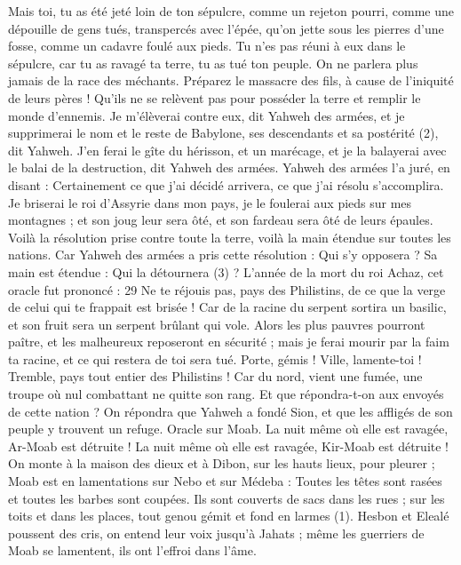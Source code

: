 \begin{multicols}{2}
Mais toi, tu as été jeté loin de ton sépulcre, comme un rejeton pourri, comme une dépouille de gens tués, transpercés avec l'épée, qu’on jette sous les pierres d’une fosse, comme un cadavre foulé aux pieds.
Tu n’es pas réuni à eux dans le sépulcre, car tu as ravagé ta terre, tu as tué ton peuple. On ne parlera plus jamais de la race des méchants.
Préparez le massacre des fils, à cause de l'iniquité de leurs pères ! Qu’ils ne se relèvent pas pour posséder la terre et remplir le monde d’ennemis.
Je m'élèverai contre eux, dit Yahweh des armées, et je supprimerai le nom et le reste de Babylone, ses descendants et sa postérité (2), dit Yahweh.
J’en ferai le gîte du hérisson, et un marécage, et je la balayerai avec le balai de la destruction, dit Yahweh des armées.
Yahweh des armées l’a juré, en disant : Certainement ce que j’ai décidé arrivera, ce que j’ai résolu s’accomplira.
Je briserai le roi d'Assyrie dans mon pays, je le foulerai aux pieds sur mes montagnes ; et son joug leur sera ôté, et son fardeau sera ôté de leurs épaules.
Voilà la résolution prise contre toute la terre, voilà la main étendue sur toutes les nations.
Car Yahweh des armées a pris cette résolution : Qui s’y opposera ? Sa main est étendue : Qui la détournera (3) ?
L'année de la mort du roi Achaz, cet oracle fut prononcé : 29 Ne te réjouis pas, pays des Philistins, de ce que la verge de celui qui te frappait est brisée ! Car de la racine du serpent sortira un basilic, et son fruit sera un serpent brûlant qui vole.
Alors les plus pauvres pourront paître, et les malheureux reposeront en sécurité ; mais je ferai mourir par la faim ta racine, et ce qui restera de toi sera tué.
Porte, gémis ! Ville, lamente-toi ! Tremble, pays tout entier des Philistins ! Car du nord, vient une fumée, une troupe où nul combattant ne quitte son rang.
Et que répondra-t-on aux envoyés de cette nation ? On répondra que Yahweh a fondé Sion, et que les affligés de son peuple y trouvent un refuge.
\VerseOne{}Oracle sur Moab. La nuit même où elle est ravagée, Ar-Moab est détruite ! La nuit même où elle est ravagée, Kir-Moab est détruite !
On monte à la maison des dieux et à Dibon, sur les hauts lieux, pour pleurer ; Moab est en lamentations sur Nebo et sur Médeba : Toutes les têtes sont rasées et toutes les barbes sont coupées.
Ils sont couverts de sacs dans les rues ; sur les toits et dans les places, tout genou gémit et fond en larmes (1).
Hesbon et Elealé poussent des cris, on entend leur voix jusqu’à Jahats ; même les guerriers de Moab se lamentent, ils ont l’effroi dans l’âme.

\end{multicols}
